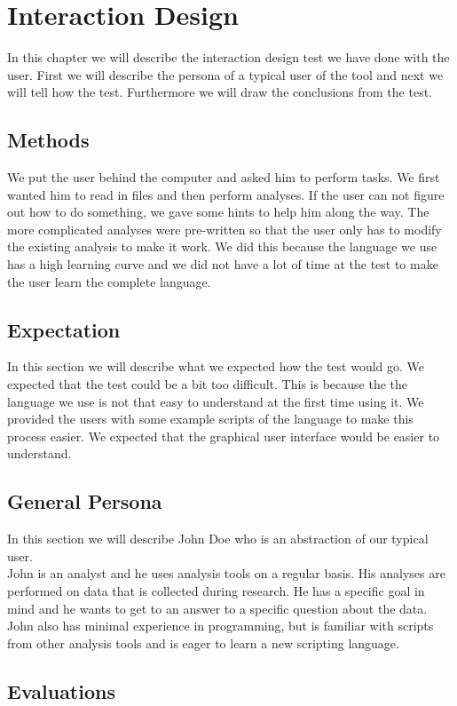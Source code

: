 \chapter{Interaction Design} %
In this chapter we will describe the interaction design test we have done with the user. First we will describe the persona of a typical user of the tool and next we will tell how the test. Furthermore we will draw the conclusions from the test.

\section{Methods}
We put the user behind the computer and asked him to perform tasks. We first wanted him to read in files and then perform analyses. If the user can not figure out how to do something, we gave some hints to help him along the way. The more complicated analyses were pre-written so that the user only has to modify the existing analysis to make it work. We did this because the language we use has a high learning curve and we did not have a lot of time at the test to make the user learn the complete language.

\section{Expectation}
In this section we will describe what we expected how the test would go. We expected that the test could be a bit too difficult. This is because the the language we use is not that easy to understand at the first time using it. We provided the users with some example scripts of the language to make this process easier.
We expected that the graphical user interface would be easier to understand.

\section{General Persona}
In this section we will describe John Doe who is an abstraction of our typical user.\\
John is an analyst and he uses analysis tools on a regular basis. His analyses are performed on data that is collected during research. He has a specific goal in mind and he wants to get to an answer to a specific question about the data. John also has minimal experience in programming, but is familiar with scripts from other analysis tools and is eager to learn a new scripting language.

\section{Evaluations}


